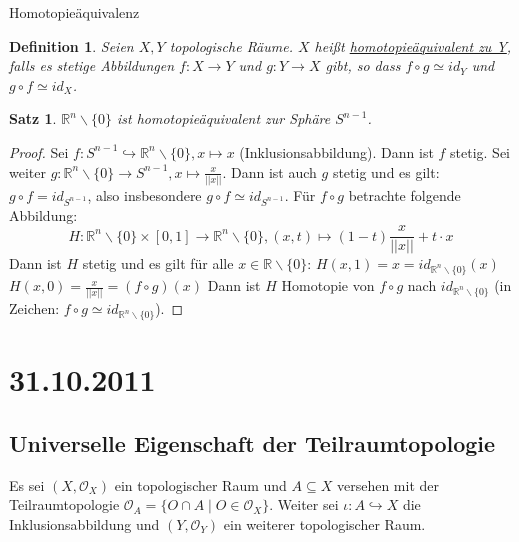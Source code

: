 \documentclass[a4paper,11pt,notitlepage]{report}
\newtheorem{definition}{Definition}[chapter]
\newtheorem{theorem}{Satz}[chapter]
\newcommand{\R}{{\ensuremath{\mathbb{R}}}}
\newcommand{\OO}{{\ensuremath{\mathcal{O}}}}
\begin{document}
\begin{section}{Homotopieäquivalenz}
	\begin{definition}
		Seien $X,Y$ topologische Räume. $X$ heißt \underline{homotopieäquivalent zu Y}, falls es stetige Abbildungen $f \colon X \rightarrow Y$ und $g \colon Y \rightarrow X$ gibt, so dass $f \circ g \simeq id_Y$ und $g \circ f \simeq id_X$.
	\end{definition}
	
	\begin{theorem}
		$\R^n \backslash \{0\}$ ist homotopieäquivalent zur Sphäre $S^{n-1}$.
	\end{theorem}
	
	\begin{proof}
		Sei $f \colon S^{n-1} \hookrightarrow \R^n \backslash \{0\}, x \mapsto x$ (Inklusionsabbildung). Dann ist $f$ stetig.
		\newline
		Sei weiter $g \colon \R^n \backslash \{0\} \rightarrow S^{n-1}, x \mapsto \frac{x}{||x||}$. Dann ist auch $g$ stetig und es gilt:
		$g \circ f = id_{S^{n-1}}$, also insbesondere $g \circ f \simeq id_{S^{n-1}}$.
		\newline
		Für $f \circ g$ betrachte folgende Abbildung:
		$$H \colon \R^n \backslash \{0\} \times [0,1] \rightarrow \R^n \backslash \{0\}, (x,t) \mapsto (1-t) \frac{x}{||x||} + t \cdot x$$
		Dann ist $H$ stetig und es gilt für alle $x \in \R \backslash \{0\}$:
		\newline
		$H(x,1) = x = id_{\R^n \backslash \{0\}}(x)$
		\newline
		$H(x,0) = \frac{x}{||x||} = (f \circ g)(x)$
		\newline
		Dann ist $H$ Homotopie von $f \circ g$ nach $id_{\R^n \backslash \{0\}}$ (in Zeichen: $f \circ g \simeq id_{\R^n \backslash \{0\}}$).
	\end{proof}
\end{section}

\chapter{31.10.2011}
\section{Universelle Eigenschaft der Teilraumtopologie}
Es sei $(X, \OO_X)$ ein topologischer Raum und $A \subseteq X$ versehen mit der Teilraumtopologie $\OO_A = \{ O \cap A \mid O \in \OO_X \}$.
Weiter sei $\iota \colon A \hookrightarrow X$ die Inklusionsabbildung und $(Y, \OO_Y)$ ein weiterer topologischer Raum.
\end{document}
